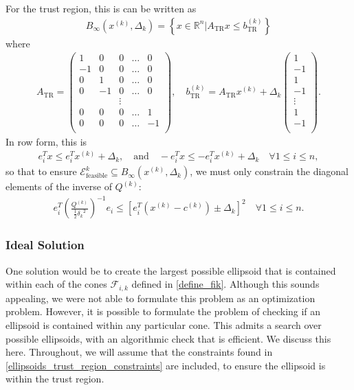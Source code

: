 \documentclass{article}
\theoremstyle{case}
\newcommand{\xk}{{x^{(k)}}}
\newcommand{\Rn}{\mathbb R^n}
\newcommand{\dk}{\Delta_k}
\newcommand{\qk}{{Q^{(k)}}}
\newcommand{\ck}{{c^{(k)}}}
\newcommand{\sdk}{{\delta_k}}
\newcommand{\unshiftedellipsoid}{{\mathcal E^k_{\text{feasible}}}}
\newcommand{\fik}{{\mathcal F_{i, k}}}
\newcommand{\tr}{{ B_{\infty}\left(\xk, \dk\right) }}
\newcommand{\atr}{{A_{\text{TR}}}}
\newcommand{\btrk}{{b^{(k)}_{\text{TR}}}}
\begin{document}
For the trust region, this is can be written as
\begin{align*}
\tr = \left\{ x \in \Rn | \atr x\le\btrk\right\}
\end{align*}
where
\begin{align*}
\atr = \begin{pmatrix}
 1 &  0 & 0      & \ldots &  0 \\
-1 &  0 & 0      & \ldots &  0 \\
 0 &  1 & 0      & \ldots &  0 \\
 0 & -1 & 0      & \ldots &  0 \\
   &    & \vdots &        &    \\
 0 &  0 &      0 & \ldots &  1 \\
 0 &  0 &      0 & \ldots & -1 \\
\end{pmatrix}, \quad
\btrk = \atr \xk + \dk \begin{pmatrix}
1 \\
-1 \\
1 \\
-1 \\
\vdots \\
1 \\
-1 \\
\end{pmatrix}.
\end{align*}
In row form, this is
\begin{align*}
e_i ^T x \le e_i^T\xk + \dk, \quad \textrm{and} \quad
-e_i ^T x \le -e_i^T\xk + \dk \quad \forall 1 \le i \le n,
\end{align*}
so that to ensure $\unshiftedellipsoid \subseteq \tr$, we must only constrain the diagonal elements of the inverse of $\qk$:
\begin{align}
e_i^T\left(\frac{\qk}{\frac 1 2 \sdk^2}\right)^{-1} e_i \le \left[e_i^T\left(\xk - \ck\right) \pm \dk \right]^2 \quad \forall 1 \le i \le n.
\label{ellipsoids_trust_region_constraints}
\end{align}


\subsubsection{Ideal Solution}
\label{ideal_ellipsoid_in_polyhedron}

One solution would be to create the largest possible ellipsoid that is contained within each of the cones $\fik$ defined in \cref{define_fik}.
Although this sounds appealing, we were not able to formulate this problem as an optimization problem.
However, it is possible to formulate the problem of checking if an ellipsoid is contained within any particular cone.
This admits a search over possible ellipsoids, with an algorithmic check that is efficient.
We discuss this here.
Throughout, we will assume that the constraints found in \cref{ellipsoids_trust_region_constraints} are included, to ensure the ellipsoid is within the trust region.
\end{document}
